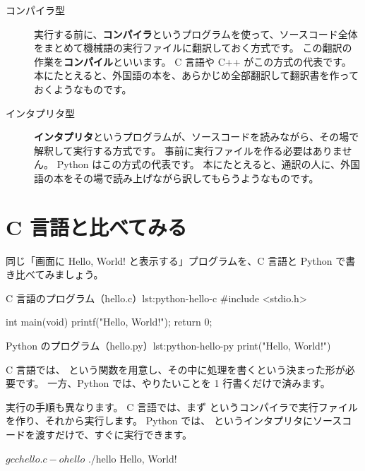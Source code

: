 \begin{description}
  \item[コンパイラ型]
    実行する前に、\textbf{コンパイラ}というプログラムを使って、ソースコード全体をまとめて機械語の実行ファイルに翻訳しておく方式です。
    この翻訳の作業を\textbf{コンパイル}といいます。
    C 言語や C++ がこの方式の代表です。
    本にたとえると、外国語の本を、あらかじめ全部翻訳して翻訳書を作っておくようなものです。
  \item[インタプリタ型]
    \textbf{インタプリタ}というプログラムが、ソースコードを読みながら、その場で解釈して実行する方式です。
    事前に実行ファイルを作る必要はありません。
    Python はこの方式の代表です。
    本にたとえると、通訳の人に、外国語の本をその場で読み上げながら訳してもらうようなものです。
\end{description}

\section{C 言語と比べてみる}
\label{sec:python-vs-c}

同じ「画面に Hello, World! と表示する」プログラムを、C 言語と Python で書き比べてみましょう。

\begin{codelisting}[style=cpp]{C 言語のプログラム（hello.c）}{lst:python-hello-c}
#include <stdio.h>

int main(void)
{
    printf("Hello, World!\n");
    return 0;
}
\end{codelisting}

\begin{codelisting}[style=python]{Python のプログラム（hello.py）}{lst:python-hello-py}
print("Hello, World!")
\end{codelisting}

C 言語では、 という関数を用意し、その中に処理を書くという決まった形が必要です。
一方、Python では、やりたいことを 1 行書くだけで済みます。

実行の手順も異なります。
C 言語では、まず  というコンパイラで実行ファイルを作り、それから実行します。
Python では、 というインタプリタにソースコードを渡すだけで、すぐに実行できます。

\begin{terminal}[C 言語のプログラムを実行する]
$ gcc hello.c -o hello
$ ./hello
Hello, World!
\end{terminal}


